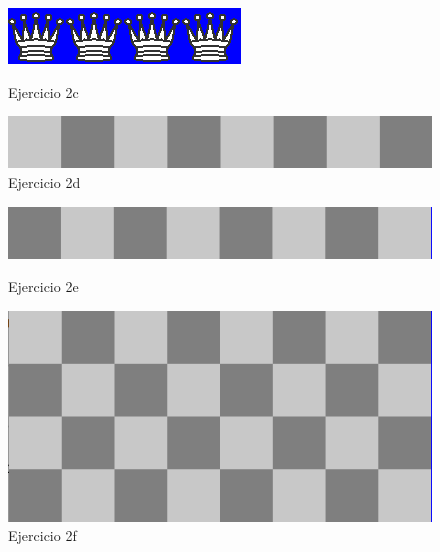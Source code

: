 \documentclass{article}
\begin{document}
 \begin{figure}[htbp]
        \begin{minipage}{0.5\textwidth}
            \centering
            \includegraphics[width=0.75\linewidth]{img/ejercicio_02_c.png}
            \caption{Ejercicio 2c}
            \label{fig:3}
        \end{minipage}%
        \begin{minipage}{0.5\textwidth}
            \centering
            \includegraphics[width=0.75\linewidth]{img/ejercicio_02_d.png}
            \caption{Ejercicio 2d}
            \label{fig:4}
        \end{minipage}
    \end{figure}
    \begin{figure}[htbp]
        \begin{minipage}{0.5\textwidth}
            \centering
            \includegraphics[width=0.75\linewidth]{img/ejercicio_02_e.png}
            \caption{Ejercicio 2e}
            \label{fig:5}
        \end{minipage}%
        \begin{minipage}{0.5\textwidth}
            \centering
            \includegraphics[width=0.75\linewidth]{img/ejercicio_02_f.png}
            \caption{Ejercicio 2f}
            \label{fig:6}
        \end{minipage}
    \end{figure}
\end{document}
